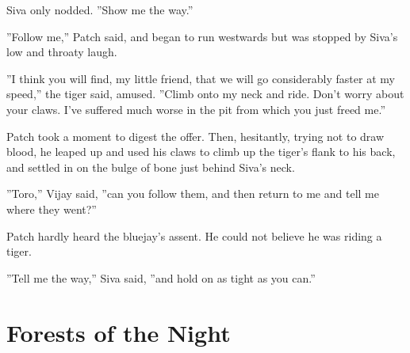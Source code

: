 \documentclass[12pt]{book}
\begin{document}
 Siva only nodded. ''Show me the way.''\par
 ''Follow me,'' Patch said, and began to run westwards %
 but was stopped by Siva's low and throaty laugh.\par
 ''I think you will find, my little friend, that we will go considerably faster at my speed,'' the tiger said, amused. ''Climb onto my neck and ride. Don't worry about your claws. I've suffered much worse in the pit from which you just freed me.''\par
 Patch took a moment to digest the offer. Then, hesitantly, trying not to draw blood, he leaped up and used his claws to climb up the tiger's flank to his back, and settled in on the bulge of bone just behind Siva's neck.\par
 ''Toro,'' Vijay said, ''can you follow them, and then return to me and tell me where they went?''\par
 Patch hardly heard the bluejay's assent. He could not believe he was riding a tiger.\par
 ''Tell me the way,'' Siva said, ''and hold on as tight as you can.''\par

\section{Forests of the Night}
\end{document}
